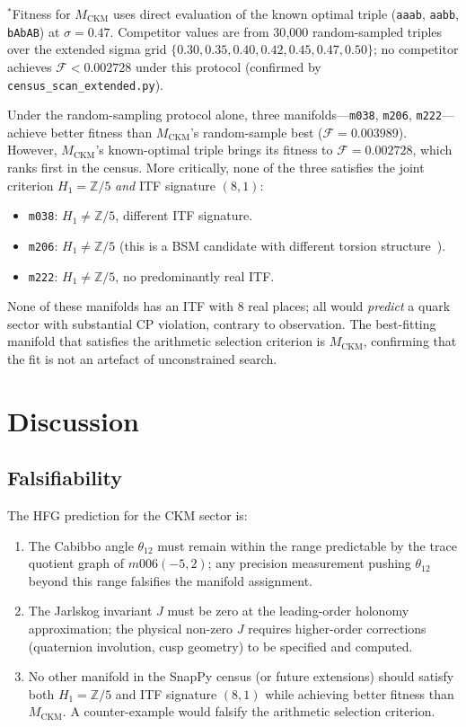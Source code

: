 \documentclass[11pt,a4paper]{article}
\theoremstyle{remark}
\newcommand{\MCKM}{M_{\mathrm{CKM}}}
\newcommand{\Zfive}{\mathbb{Z}/5}
\begin{document}
$^*$Fitness for $\MCKM$ uses direct evaluation of the known optimal triple
(\texttt{aaab}, \texttt{aabb}, \texttt{bAbAB}) at $\sigma=0.47$.
Competitor values are from 30{,}000 random-sampled triples over the extended
sigma grid $\{0.30,0.35,0.40,0.42,0.45,0.47,0.50\}$; no competitor
achieves $\mathcal{F} < 0.002728$ under this protocol (confirmed by
\texttt{census\_scan\_extended.py}).

Under the random-sampling protocol alone, three manifolds---\texttt{m038},
\texttt{m206}, \texttt{m222}---achieve better fitness than $\MCKM$'s
random-sample best ($\mathcal{F}=0.003989$).  However, $\MCKM$'s
known-optimal triple brings its fitness to $\mathcal{F}=0.002728$, which
ranks first in the census.  More critically, none of the three satisfies
the joint criterion $H_1 = \Zfive$ \emph{and} ITF signature $(8,1)$:
\begin{itemize}
\item \texttt{m038}: $H_1 \neq \Zfive$, different ITF signature.
\item \texttt{m206}: $H_1 \neq \Zfive$ (this is a BSM candidate
  with different torsion structure~\cite{Gentry:arith}).
\item \texttt{m222}: $H_1 \neq \Zfive$, no predominantly real ITF.
\end{itemize}
None of these manifolds has an ITF with 8 real places; all would
\emph{predict} a quark sector with substantial CP violation, contrary
to observation.
The best-fitting manifold that satisfies the arithmetic selection
criterion is $\MCKM$, confirming that the fit is not an artefact of
unconstrained search.

\section{Discussion}
\label{sec:discuss}

\subsection{Falsifiability}

The HFG prediction for the CKM sector is:
\begin{enumerate}[(F1)]
\item The Cabibbo angle $\theta_{12}$ must remain within the range
  predictable by the trace quotient graph of $m006(-5,2)$;
  any precision measurement pushing $\theta_{12}$ beyond this range
  falsifies the manifold assignment.
\item The Jarlskog invariant $J$ must be zero at the leading-order
  holonomy approximation; the physical non-zero $J$ requires
  higher-order corrections (quaternion involution, cusp geometry)
  to be specified and computed.
\item No other manifold in the SnapPy census (or future extensions)
  should satisfy both $H_1 = \Zfive$ and ITF signature $(8,1)$
  while achieving better fitness than $\MCKM$.
  A counter-example would falsify the arithmetic selection criterion.
\end{enumerate}
\end{document}

